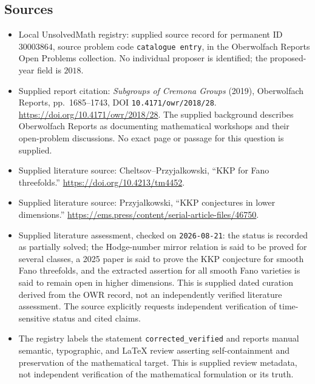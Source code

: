 \documentclass[11pt]{article}
\begin{document}
\subsection{Sources}
\begin{itemize}
\item Local UnsolvedMath registry: supplied source record for permanent ID \(30003864\), source problem code \texttt{catalogue entry}, in the Oberwolfach Reports Open Problems collection. No individual proposer is identified; the proposed-year field is \(2018\).
\item Supplied report citation: \emph{Subgroups of Cremona Groups} (2019), Oberwolfach Reports, pp.\ 1685--1743, DOI \texttt{10.4171/owr/2018/28}. \url{https://doi.org/10.4171/owr/2018/28}. The supplied background describes Oberwolfach Reports as documenting mathematical workshops and their open-problem discussions. No exact page or passage for this question is supplied.
\item Supplied literature source: Cheltsov--Przyjalkowski, ``KKP for Fano threefolds.'' \url{https://doi.org/10.4213/tm4452}.
\item Supplied literature source: Przyjalkowski, ``KKP conjectures in lower dimensions.'' \url{https://ems.press/content/serial-article-files/46750}.
\item Supplied literature assessment, checked on \texttt{2026-08-21}: the status is recorded as partially solved; the Hodge-number mirror relation is said to be proved for several classes, a 2025 paper is said to prove the KKP conjecture for smooth Fano threefolds, and the extracted assertion for all smooth Fano varieties is said to remain open in higher dimensions. This is supplied dated curation derived from the OWR record, not an independently verified literature assessment. The source explicitly requests independent verification of time-sensitive status and cited claims.
\item The registry labels the statement \texttt{corrected\_verified} and reports manual semantic, typographic, and LaTeX review asserting self-containment and preservation of the mathematical target. This is supplied review metadata, not independent verification of the mathematical formulation or its truth.
\end{itemize}
\end{document}
